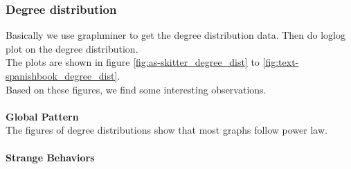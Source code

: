 
\subsubsection{Degree distribution}
Basically we use graphminer to get the degree distribution data. Then do loglog plot on the degree distribution. \\
The plots are shown in figure \ref{fig:as-skitter_degree_dist} to  \ref{fig:text-spanishbook_degree_dist}. \\
Based on these figures, we find some interesting observations.\\
\\
\textbf{Global Pattern} \\
The figures of degree distributions show that most graphs follow power law. \\
\\
\textbf{Strange Behaviors} \\
